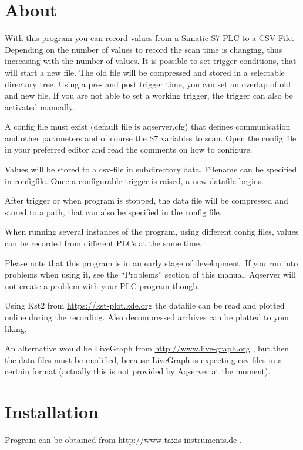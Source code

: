 \documentclass[a4paper,10pt,english]{sphinxmanual}
\begin{document}
\chapter{About}
\label{about:about}\label{about:aqserver-siemens-s7-data-acquisition-server}\label{about::doc}
With this program you can record values from a Simatic S7 PLC to a CSV File. Depending on the number of values to record the scan time is changing, thus increasing with the number of values. It is possible to set trigger conditions, that will start a new file. The old file will be compressed and stored in a selectable directory tree.
Using a pre- and post trigger time, you can set an overlap of old and new file. If you are not able to set a working trigger, the trigger can also be activated manually.

A config file must exist (default file is aqserver.cfg) that defines communication and other parameters and of course the S7 variables to scan. Open the config file in your preferred editor and read the comments on how to
configure.

Values will be stored to a csv-file in subdirectory data. Filename can be specified in configfile. Once a configurable trigger is raised, a new datafile begins.

After trigger or when program is stopped, the data file will be compressed and stored to a path, that can also be specified in the config file.

When running several instances of the program, using different config files, values can be recorded from different PLCs at the same time.

Please note that this program is in an early stage of development. If you run into problems when using it, see the ``Problems'' section of this manual. Aqserver will not create a problem with your PLC program though.

Using Kst2 from \href{https://kst-plot.kde.org}{https://kst-plot.kde.org} the datafile can be read and plotted online during the recording. Also decompressed archives can be plotted to your liking.

An alternative would be LiveGraph from \href{http://www.live-graph.org}{http://www.live-graph.org} , but then the data files must be modified, because LiveGraph is expecting csv-files in a certain format (actually this is not provided by Aqserver at the moment).


\chapter{Installation}
\label{installation:installation}\label{installation::doc}
Program can be obtained from \href{http://www.taxis-instruments.de}{http://www.taxis-instruments.de} .
\end{document}

